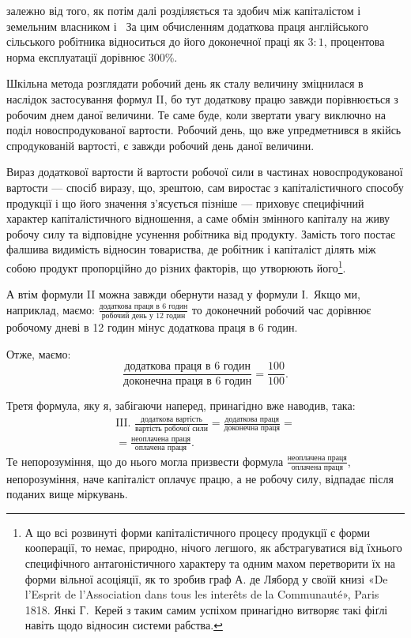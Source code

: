 \parcont{}  %
залежно від того, як потім далі розділяється та здобич між капіталістом
і земельним власником і~ За цим обчисленням
додаткова праця англійського сільського робітника відноситься
до його доконечної праці як $3 : 1$, процентова норма експлуатації
дорівнює 300\%.

Шкільна метода розглядати робочий день як сталу величину
зміцнилася в наслідок застосування формул II, бо тут додаткову
працю завжди порівнюється з робочим днем даної величини.
Те саме буде, коли звертати увагу виключно на поділ новоспродукованої
вартости. Робочий день, що вже упредметнився в якійсь
спродукованій вартості, є завжди робочий день даної величини.

Вираз додаткової вартости й вартости робочої сили в частинах
новоспродукованої вартости — спосіб виразу, що, зрештою,
сам виростає з капіталістичного способу продукції і що його
значення з’ясується пізніше — приховує специфічний характер
капіталістичного відношення, а саме обмін змінного капіталу
на живу робочу силу та відповідне усунення робітника від продукту.
Замість того постає фалшива видимість відносин товариства,
де робітник і капіталіст ділять між собою продукт пропорційно
до різних факторів, що утворюють його\footnote{
А що всі розвинуті форми капіталістичного процесу продукції
є форми кооперації, то немає, природно, нічого легшого, як абстрагуватися
від їхнього специфічного антагоністичного характеру та одним
махом перетворити їх на форми вільної асоціяції, як то зробив граф
А. де Ляборд у своїй книзі «De l’Esprit de l’Association dans tous les
interêts de la Communauté», Paris 1818. Янкі Г.~Керей з таким самим
успіхом принагідно витворяє такі фіґлі навіть щодо відносин системи
рабства.
}.

А втім формули II можна завжди обернути назад у формули І.~Якщо ми, наприклад, маємо: $\frac{\text{додаткова праця в 6 годин}}{\text{робочий день у 12 годин}}$
то доконечний робочий час дорівнює робочому дневі в 12 годин мінус
додаткова праця в 6 годин.

Отже, маємо:\[
\frac{\text{додаткова праця в 6 годин}}{\text{доконечна праця в 6 годин}} = \frac{100}{100}\text{.}
\]

Третя формула, яку я, забігаючи наперед, принагідно вже
наводив, така:
\begin{gather*}
\text{III. }
\frac{\text{додаткова вартість}}{\text{вартість робочої сили}} =
\frac{\text{додаткова праця}}{\text{доконечна праця}} = \\
= \frac{\text{неоплачена праця}}{\text{оплачена праця}}
\text{.}
\end{gather*}
Те непорозуміння, що до нього могла призвести формула
$\frac{\text{неоплачена праця}}{\text{оплачена праця}}$, непорозуміння, наче капіталіст оплачує працю,
а не робочу силу, відпадає після поданих вище міркувань.
\parbreak{}  %

